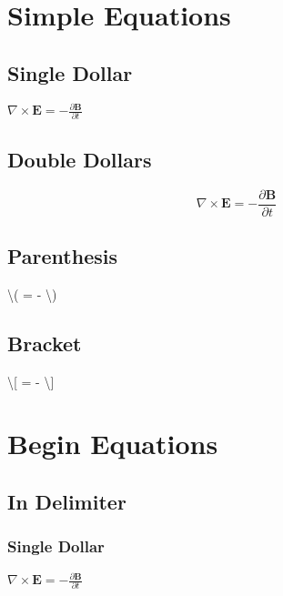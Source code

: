 \documentclass[]{article}
\date{}
\begin{document}
\section{Simple Equations}\label{simple-equations}

\subsection{Single Dollar}\label{single-dollar}

\(\nabla \times \mathbf{E} = - \frac{\partial \mathbf{B}}{\partial t}\)

\subsection{Double Dollars}\label{double-dollars}

\[\nabla \times \mathbf{E} = - \frac{\partial \mathbf{B}}{\partial t}\]

\subsection{Parenthesis}\label{parenthesis}

\textbackslash{}(\nabla \times {} = -
\textbackslash{})

\subsection{Bracket}\label{bracket}

\textbackslash{}{[}\nabla \times {} = -
\textbackslash{}{]}

\section{Begin Equations}\label{begin-equations}

\subsection{In Delimiter}\label{in-delimiter}

\subsubsection{Single Dollar}\label{single-dollar-1}

\(\begin{equation}\nabla \times \mathbf{E} = - \frac{\partial \mathbf{B}}{\partial t}\end{equation}\)
\end{document}
